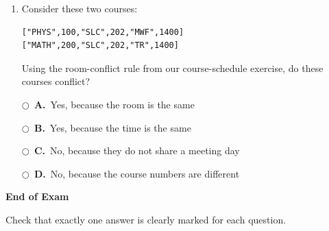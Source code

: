 \documentclass[11pt]{article}
\newcommand{\choice}[2]{%
    \par\noindent
    \(\bigcirc\)\ \textbf{#1.}\ #2
}
\begin{document}
\begin{enumerate}
\choice{A}{[930, 1100, 1400, 1530]}

\choice{B}{[1530, 1400, 1100, 930]}

\choice{C}{[930, 1400, 1100, 1530]}

\choice{D}{[1100, 930, 1530, 1400]}



\item Consider these two courses:

\begin{verbatim}
["PHYS",100,"SLC",202,"MWF",1400]
["MATH",200,"SLC",202,"TR",1400]
\end{verbatim}

Using the room-conflict rule from our course-schedule exercise,
do these courses conflict?

\choice{A}{Yes, because the room is the same}

\choice{B}{Yes, because the time is the same}

\choice{C}{No, because they do not share a meeting day}

\choice{D}{No, because the course numbers are different}

\end{enumerate}

\vfill

\begin{center}
\textbf{End of Exam}

Check that exactly one answer is clearly marked for each question.
\end{center}
\end{document}
